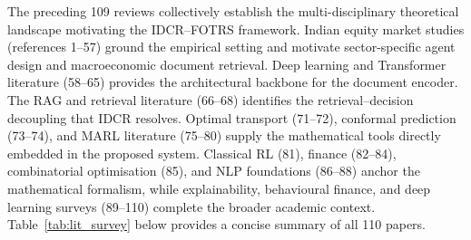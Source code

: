 \documentclass[12pt,a4paper,oneside]{report}
\theoremstyle{definition}
\theoremstyle{remark}
\begin{document}
\vspace{1.5em}
\noindent The preceding 109 reviews collectively establish the multi-disciplinary theoretical landscape motivating the IDCR--FOTRS framework. Indian equity market studies (references 1--57) ground the empirical setting and motivate sector-specific agent design and macroeconomic document retrieval. Deep learning and Transformer literature (58--65) provides the architectural backbone for the document encoder. The RAG and retrieval literature (66--68) identifies the retrieval--decision decoupling that IDCR resolves. Optimal transport (71--72), conformal prediction (73--74), and MARL literature (75--80) supply the mathematical tools directly embedded in the proposed system. Classical RL (81), finance (82--84), combinatorial optimisation (85), and NLP foundations (86--88) anchor the mathematical formalism, while explainability, behavioural finance, and deep learning surveys (89--110) complete the broader academic context. Table~\ref{tab:lit_survey} below provides a concise summary of all 110 papers.
\end{document}
